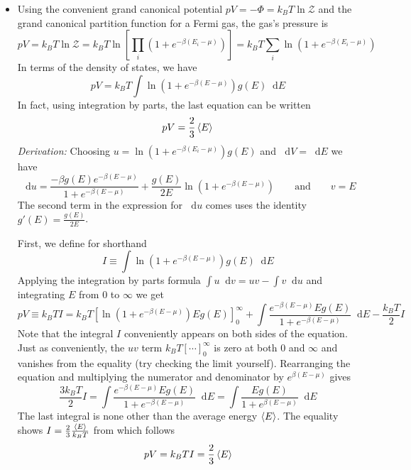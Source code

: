 \documentclass[11pt, a4paper]{article}
\newcommand{\diff}{\mathop{}\!\mathrm{d}} %
\begin{document}
\begin{itemize}
	\item Using the convenient grand canonical potential $ pV = - \Phi = k_{B}T \ln \mathcal{Z} $ and the grand canonical partition function for a Fermi gas, the gas's pressure is
	\begin{equation*}
		pV = k_{B}T \ln \mathcal{Z} = k_{B}T \ln \left[\prod_{i} (1 + e^{-\beta(E_{i} - \mu)})\right] = k_{B}T \sum_{i} \ln(1 + e^{-\beta(E_{i} - \mu)})
	\end{equation*}
	In terms of the density of states, we have
	\begin{equation*}
		pV = k_{B}T \int \ln(1 + e^{-\beta(E - \mu)}) g(E)\diff E
	\end{equation*}
	In fact, using integration by parts, the last equation can be written
	\begin{equation*}
		pV = \frac{2}{3} \expval{E}
	\end{equation*}
	\textit{Derivation:} Choosing $ u = \ln(1 + e^{-\beta(E_{i} - \mu)}) g(E) $ and $ \diff V = \diff E $ we have
	\begin{equation*}
		\diff u = \frac{- \beta g(E) e^{-\beta(E - \mu)}}{1 + e^{-\beta(E - \mu)}} + \frac{g(E)}{2E}\ln(1 + e^{-\beta(E - \mu)})  \qquad \text{and} \qquad v = E
	\end{equation*}
	The second term in the expression for $ \diff u $ comes uses the identity $ g'(E) = \frac{g(E)}{2E} $. 
	
	First, we define for shorthand 
	\begin{equation*}
		I \equiv \int \ln(1 + e^{-\beta(E - \mu)}) g(E)\diff E
	\end{equation*}
	Applying the integration by parts formula $ \int u \diff v = uv - \int v\diff u $ and integrating $ E $ from  $ 0 $ to $ \infty $ we get
	\begin{equation*}
		pV \equiv k_{B}T I = k_{B}T \left[\ln(1 + e^{-\beta(E - \mu)})Eg(E)\right]_{0}^{\infty} + \int \frac{e^{-\beta(E - \mu)} E g(E)}{1 + e^{-\beta(E - \mu)}} \diff E - \frac{k_{B}T}{2}I
	\end{equation*}
	Note that the integral $ I $ conveniently appears on both sides of the equation. Just as conveniently, the $ uv $ term $  k_{B}T[\cdots]_{0}^{\infty} $ is zero at both $ 0 $ and $ \infty $ and vanishes from the equality (try checking the limit yourself). Rearranging the equation and multiplying the numerator and denominator by $ e^{\beta(E - \mu)} $ gives
	\begin{equation*}
		\frac{3k_{B}T}{2}I = \int \frac{e^{-\beta(E - \mu)} E g(E)}{1 + e^{-\beta(E - \mu)}} \diff E = \int \frac{E g(E)}{1 + e^{\beta(E - \mu)}} \diff E
	\end{equation*}
	The last integral is none other than the average energy $ \expval{E} $. The equality shows $ I = \frac{2}{3} \frac{\expval{E}}{k_{B}T} $ from which follows
	\begin{equation*}
		pV = k_{B}T I = \frac{2}{3} \expval{E}
	\end{equation*}	
	
\end{itemize}
\end{document}
